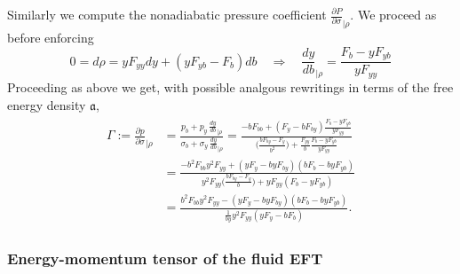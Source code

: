 Similarly we compute the nonadiabatic pressure coefficient $\frac{\partial P}{\partial \sigma}_{|\rho}$.
We proceed as before enforcing 
\begin{equation}
    0=d\rho=yF_{yy}dy+(yF_{yb}-F_b)db\quad \Rightarrow\quad \frac{dy}{db}_{|\rho}=\frac{F_b-yF_{yb}}{yF_{yy}}
\end{equation}
Proceeding as above we get, with possible analgous rewritings in terms of the free energy density $\mathfrak{a}$,
{\small
\begin{align}\label{eq:nonadiabatic_pressure_coefficient_gamma}
\begin{aligned}
    \Gamma:=\frac{\partial p}{\partial \sigma}_{\mid\rho}&=\frac{p_b + p_y\, \tfrac{dy}{db}_{\mid\rho}}{\sigma_b + \sigma_y\, \tfrac{dy}{db}_{\mid\rho}}=\frac{-bF_{bb}+(F_y-bF_{by})\tfrac{F_b-yF_{yb}}{yF_{yy}}}{\Big(\tfrac{bF_{by}-F_y}{b^2}\Big)+\tfrac{F_{yy}}{b}\frac{F_b-yF_{yb}}{yF_{yy}}}
    \\
    &=\frac{-b^2F_{bb}y^2F_{yy}+(yF_y-byF_{by})(bF_b-byF_{yb})}{y^2F_{yy}\Big(\tfrac{bF_{by}-F_y}{b}\Big)+yF_{yy}(F_b-yF_{yb})}
    \\
    &=\frac{b^2F_{bb}y^2F_{yy}-(yF_y-byF_{by})(bF_b-byF_{yb})}{\tfrac{1}{by}y^2F_{yy}(yF_y-bF_b)}.
\end{aligned}\end{align}}



\subsubsection{Energy-momentum tensor of the fluid EFT}


